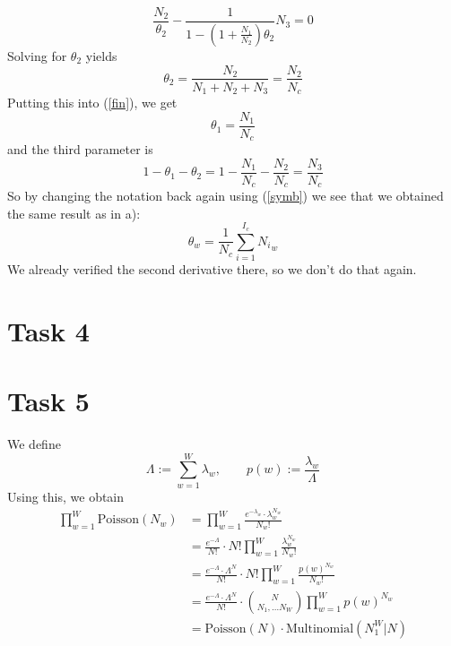 \documentclass[%
   11pt,              %
   ngerman,           %
   a4paper,           %
   DIV11,             %
]{scrartcl}%
\begin{document}
\begin{equation*}
	\frac{N_2}{\theta_2} - \frac{1}{1 - (1 + \frac{N_1}{N_2})\theta_2}N_3 = 0
\end{equation*}
Solving for $\theta_2$ yields
\begin{equation*}
	\theta_2 = \frac{N_2}{N_1 + N_2 + N_3} = \frac{N_2}{N_c}
\end{equation*}
Putting this into (\ref{fin}), we get
\begin{equation*}
	\theta_1 =  \frac{N_1}{N_c}
\end{equation*}
and the third parameter is
\begin{equation*}
	1 - \theta_1 - \theta_2 = 1 - \frac{N_1}{N_c} - \frac{N_2}{N_c} = \frac{N_3}{N_c}
\end{equation*}
So by changing the notation back again using (\ref{symb}) we see that we obtained the same result as in a):
\begin{equation*}
	\theta_w = \frac{1}{N_c} \sum_{i=1}^{I_c} {N_i}_w
\end{equation*}
We already verified the second derivative there, so we don't do that again.
\section*{Task 4}
\section*{Task 5}
We define
\begin{equation*}
	\Lambda := \sum_{w=1}^W \lambda_w, \qquad p(w) := \frac{\lambda_w}{\Lambda}
\end{equation*}
Using this, we obtain
\begin{align*}
\prod_{w=1}^W \text{Poisson}(N_w) &= \prod_{w=1}^W \frac{e^{-\lambda_w} \cdot \lambda_w^{N_w}}{N_w !} \\
&= \frac{e^{-\Lambda}}{N!} \cdot N! \prod_{w=1}^W \frac{\lambda_w^{N_w}}{N_w !} \\
&= \frac{e^{-\Lambda} \cdot \Lambda^N}{N!} \cdot N! \prod_{w=1}^W \frac{p(w)^{N_w}}{N_w !} \\
&= \frac{e^{-\Lambda} \cdot \Lambda^N}{N!} \cdot {N \choose N_1,\ldots N_W} \prod_{w=1}^W p(w)^{N_w} \\
&= \text{Poisson}(N) \cdot \text{Multinomial}(N_1^W|N)
\end{align*}
\end{document}
